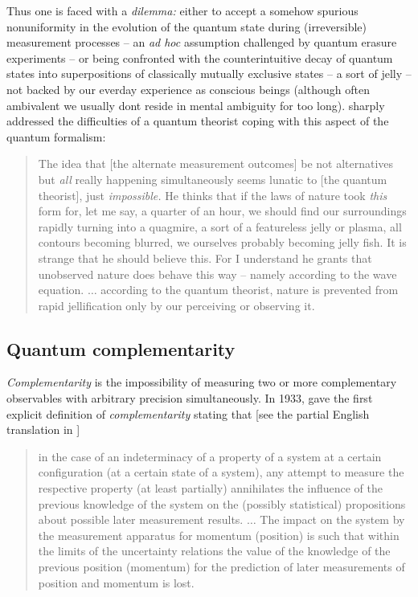 \documentclass[%
 reprint,
 showpacs,
 showkeys,
 preprintnumbers,
 amsmath,amssymb,
 aps,
 prl,
  longbibliography,
 ]{revtex4-1}
\begin{document}
Thus one is faced with a {\em dilemma:}
either to accept a somehow spurious nonuniformity in the evolution of the quantum state
during (irreversible) measurement processes -- an {\it ad hoc} assumption challenged by quantum erasure experiments --
or being confronted with the counterintuitive decay of quantum states into superpositions of
classically mutually exclusive states -- a sort of jelly -- not backed by our everday
experience as conscious beings (although often ambivalent we usually dont reside in mental ambiguity for too long).
\citet[19--20]{schroedinger-interpretation} sharply addressed the difficulties of a quantum theorist
coping with this aspect of the quantum formalism:
\begin{quote}
{
The idea that  [the alternate measurement outcomes] be not alternatives but {\em all} really happening simultaneously
seems lunatic to [the quantum theorist], just {\em impossible.}
He thinks that if the laws of nature took {\em this} form for,
let me say,
a quarter of an hour, we should find our surroundings rapidly turning into a quagmire, a sort of a featureless jelly or plasma,
all contours becoming blurred, we ourselves probably becoming jelly fish.
It is strange that he should believe this.
For I understand he grants that unobserved nature does behave this way -- namely according to the wave equation.
$\ldots$ according to the quantum theorist, nature is prevented from rapid
jellification only by our perceiving or observing it.
}
\end{quote}


\subsection{Quantum complementarity}

{\em Complementarity} is the impossibility of measuring
two or more complementary observables
with arbitrary precision simultaneously.
In 1933, \citet[7]{pauli:58} gave the first explicit definition of {\em complementarity} stating that
[see the partial English translation in \cite[369]{jammer:89}]
\begin{quote}
{
in the case of  an indeterminacy of a property of a system at a certain configuration
(at a certain state of a system), any attempt to measure the respective property (at least partially)
annihilates the influence of the previous knowledge of the system on the (possibly statistical) propositions
about possible later measurement results.
$\ldots$
The impact
on the system by the  measurement apparatus for momentum (position) is such that
within the limits of the uncertainty relations
the value of the knowledge of the previous position (momentum) for the
prediction of later measurements of position and momentum is lost.
}
\end{quote}
\end{document}
